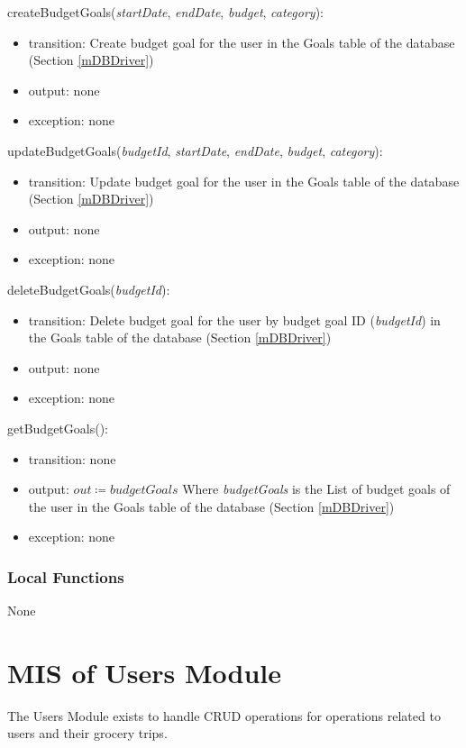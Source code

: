 \documentclass[12pt, titlepage]{article}
\begin{document}
\noindent createBudgetGoals(\textit{startDate}, \textit{endDate}, \textit{budget}, \textit{category}):
\begin{itemize}
\item transition: Create budget goal for the user in the Goals table of the database (Section \ref{mDBDriver})
\item output: none
\item exception: none
\end{itemize}

\noindent updateBudgetGoals(\textit{budgetId}, \textit{startDate}, \textit{endDate}, \textit{budget}, \textit{category}):
\begin{itemize}
\item transition: Update budget goal for the user in the Goals table of the database (Section \ref{mDBDriver})
\item output: none
\item exception: none
\end{itemize}

\noindent deleteBudgetGoals(\textit{budgetId}):
\begin{itemize}
\item transition: Delete budget goal for the user by budget goal ID (\textit{budgetId}) in the Goals table of the database (Section \ref{mDBDriver})
\item output: none
\item exception: none
\end{itemize}

\noindent getBudgetGoals():
\begin{itemize}
\item transition: none
\item output: \( \textit{out} \coloneqq budgetGoals \) Where \textit{budgetGoals} is the List of budget goals of the user in the Goals table of the database (Section \ref{mDBDriver})
\item exception: none
\end{itemize}


\subsubsection{Local Functions}
None

\newpage

\section{MIS of Users Module} \label{mUsers} 
The Users Module exists to handle CRUD operations for operations related to users and their grocery trips.
\end{document}
